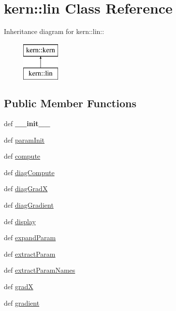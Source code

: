 \hypertarget{classkern_1_1lin}{
\section{kern::lin Class Reference}
\label{classkern_1_1lin}
}
Inheritance diagram for kern::lin::\begin{figure}[H]
\begin{center}
\leavevmode
\includegraphics[height=2cm]{classkern_1_1lin}
\end{center}
\end{figure}
\subsection*{Public Member Functions}
\begin{CompactItemize}
\item 
\hypertarget{classkern_1_1lin_59909da6685c26988c716bf2c184a7f5}{
def \textbf{\_\-\_\-init\_\-\_\-}}
\label{classkern_1_1lin_59909da6685c26988c716bf2c184a7f5}

\item 
def \hyperlink{classkern_1_1lin_9eeb97cbc165d5825fdba59a45708c53}{paramInit}
\item 
def \hyperlink{classkern_1_1lin_38ca0676026a784df6529071fa572514}{compute}
\item 
def \hyperlink{classkern_1_1lin_006ba41a9245cb67da4a7d287b2423a5}{diagCompute}
\item 
def \hyperlink{classkern_1_1lin_e2f61ac06697bd58a4e8e58b43cbfa60}{diagGradX}
\item 
def \hyperlink{classkern_1_1lin_82e5c69d97b96f51a2dc32df91393aab}{diagGradient}
\item 
def \hyperlink{classkern_1_1lin_5f51f5aa6fb00f2435cf8a1d98b15ba1}{display}
\item 
def \hyperlink{classkern_1_1lin_52fab26598da0c88e64a63391d21255f}{expandParam}
\item 
def \hyperlink{classkern_1_1lin_c4f856301081962dd76ed1bc6a226c30}{extractParam}
\item 
def \hyperlink{classkern_1_1lin_5995d707a3fc482ed6c3abb1798e23a3}{extractParamNames}
\item 
def \hyperlink{classkern_1_1lin_ab69ae24e2845a8423f4fb12bae84198}{gradX}
\item 
def \hyperlink{classkern_1_1lin_383b1fe62ceac741d33759118cf30f3a}{gradient}
\end{CompactItemize}
